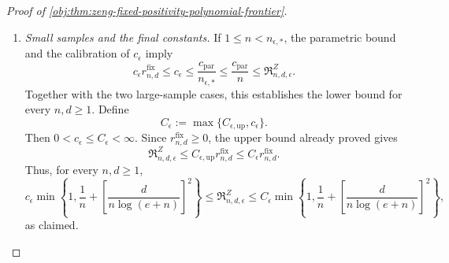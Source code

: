 \begin{proof}[Proof of \cref{obj:thm:zeng-fixed-positivity-polynomial-frontier}]
\begin{enumerate}
\item \textit{Small samples and the final constants.}
If \(1\le n<n_{\epsilon,*}\), the parametric bound and the calibration
of \(c_\epsilon\) imply
\[
c_\epsilon r^{\mathrm{fix}}_{n,d}
\le c_\epsilon
\le\frac{c_{\mathrm{par}}}{n_{\epsilon,*}}
\le\frac{c_{\mathrm{par}}}{n}
\le\mathfrak R^Z_{n,d,\epsilon}.
\]
Together with the two large-sample cases, this establishes the lower
bound for every \(n,d\ge1\). Define
\[
C_\epsilon:=\max\{C_{\epsilon,\mathrm{up}},c_\epsilon\}.
\]
Then \(0<c_\epsilon\le C_\epsilon<\infty\). Since
\(r^{\mathrm{fix}}_{n,d}\ge0\), the upper bound already proved gives
\[
\mathfrak R^Z_{n,d,\epsilon}
\le
C_{\epsilon,\mathrm{up}}r^{\mathrm{fix}}_{n,d}
\le
C_\epsilon r^{\mathrm{fix}}_{n,d}.
\]
Thus, for every \(n,d\ge1\),
\[
c_\epsilon
\min\left\{
1,\frac1n+\left[\frac d{n\log(e+n)}\right]^2
\right\}
\le
\mathfrak R^Z_{n,d,\epsilon}
\le
C_\epsilon
\min\left\{
1,\frac1n+\left[\frac d{n\log(e+n)}\right]^2
\right\},
\]
as claimed.
\end{enumerate}
\end{proof}

